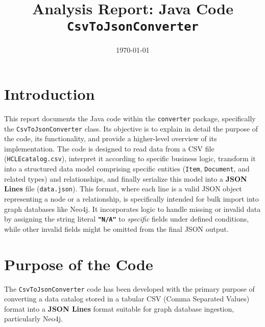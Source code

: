 \documentclass[11pt, a4paper]{article}
\title{Analysis Report: Java Code \texttt{CsvToJsonConverter} }
\date{\today} %
\begin{document}
\maketitle
\thispagestyle{empty} %

\newpage
\tableofcontents %
\thispagestyle{empty} %

\newpage
\setcounter{page}{1} %

\section{Introduction}
This report documents the Java code within the \texttt{converter} package, specifically the \texttt{CsvToJsonConverter} class. Its objective is to explain in detail the purpose of the code, its functionality, and provide a higher-level overview of its implementation. The code is designed to read data from a CSV file (\texttt{HCLEcatalog.csv}), interpret it according to specific business logic, transform it into a structured data model comprising specific entities (\texttt{Item}, \texttt{Document}, and related types) and relationships, and finally serialize this model into a \textbf{JSON Lines} file (\texttt{data.json}). This format, where each line is a valid JSON object representing a node or a relationship, is specifically intended for bulk import into graph databases like Neo4j. It incorporates logic to handle missing or invalid data by assigning the string literal \textbf{\texttt{"N/A"}} to \textit{specific} fields under defined conditions, while other invalid fields might be omitted from the final JSON output.

\section{Purpose of the Code}
The \texttt{CsvToJsonConverter} code has been developed with the primary purpose of converting a data catalog stored in a tabular CSV (Comma Separated Values) format into a \textbf{JSON Lines} format suitable for graph database ingestion, particularly Neo4j.
\end{document}
